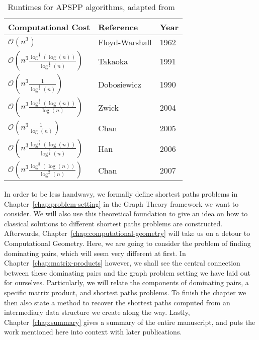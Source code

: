 \setlength{\tabcolsep}{18pt}
\renewcommand{\arraystretch}{1.5}
\begin{table}
    \centering
    \begin{tabular}{| l | l | l |}
        \hline
        Computational Cost & Reference & Year \\
        \hline
        $\mathcal{O}\left( n^3 \right)$ & Floyd-Warshall & 1962 \\
        $\mathcal{O}\left( n^3 \frac{\log^{\frac{1}{2}}(\log(n))}{\log^{\frac{1}{2}}(n)} \right)$ & Takaoka~\cite{Takaoka1992} & 1991 \\
        $\mathcal{O}\left( n^3 \frac{1}{\log^{\frac{1}{2}}(n)} \right)$ & Dobosiewicz~\cite{Dobosiewicz2007} & 1990 \\
        $\mathcal{O}\left( n^3 \frac{\log^{\frac{1}{2}}(\log(n))}{\log(n)} \right)$ & Zwick~\cite{Zwick2004} & 2004 \\
        $\mathcal{O}\left( n^3 \frac{1}{\log(n)} \right)$ & Chan~\cite{Chan2007} & 2005 \\
        $\mathcal{O}\left( n^3 \frac{\log^{\frac{5}{4}}(\log(n))}{\log^{\frac{5}{4}}(n)} \right)$ & Han~\cite{Han2008} & 2006 \\
        $\mathcal{O}\left( n^3 \frac{\log^3(\log(n))}{\log^2(n)} \right)$ & Chan~\cite{Chan2010} & 2007 \\
        \hline
    \end{tabular}
    \caption{Runtimes for APSPP algorithms, adapted from~\cite[Table~1.1]{Chan2010}\label{tab:runtimes}}
\end{table}

In order to be less handwavy, we formally define shortest paths problems in Chapter~\ref{chap:problem-setting} in the Graph Theory framework we want to consider.
We will also use this theoretical foundation to give an idea on how to classical solutions to different shortest paths problems are constructed.
Afterwards, Chapter~\ref{chap:computational-geometry} will take us on a detour to Computational Geometry.
Here, we are going to consider the problem of finding dominating pairs, which will seem very different at first.
In Chapter~\ref{chap:matrix-products} however, we shall see the central connection between these dominating pairs and the graph problem setting we have laid out for ourselves.
Particularly, we will relate the components of dominating pairs, a specific matrix product, and shortest paths problems.
To finish the chapter we then also state a method to recover the shortest paths computed from an intermediary data structure we create along the way.
Lastly, Chapter~\ref{chap:summary} gives a summary of the entire manuscript, and puts the work mentioned here into context with later publications.

